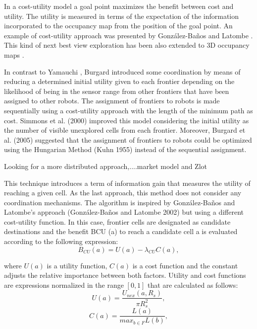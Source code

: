 In a cost-utility model a goal point maximizes the benefit between cost and utility. The utility is measured in terms of the expectation of the information incorporated to the occupancy map from the position of the goal point. An example of cost-utility approach was presented by González-Baños and Latombe \cite{GonzlezBaos2002}. This kind of next best view exploration has been also extended to 3D occupancy maps \cite{Surmann2003}.

In contrast to Yamauchi \cite{Yamauchi1998}, Burgard \cite{Burgard2000} introduced some coordination by means of reducing a determined initial utility given to each frontier depending on the likelihood of being in the sensor range from other frontiers that have been assigned to other robots. The assignment of
frontiers to robots is made sequentially using a cost-utility
approach with the length of the minimum path as cost.\cite{Simmons2000} Simmons et al. (2000) improved this model considering the initial utility as the number of visible unexplored cells from
each frontier. Moreover, Burgard et al. (2005) \cite{Burgard2005} suggested that
the assignment of frontiers to robots could be optimized using the Hungarian Method (Kuhn 1955) instead of the sequential assignment.

Looking for a more distributed approach,....market model and Zlot

This technique introduces a term of information gain that
measures the utility of reaching a given cell. As the last
approach, this method does not consider any coordination
mechanisms. The algorithm is inspired by González-Baños
and Latombe’s approach (González-Baños and Latombe
2002) but using a different cost-utility function. In this case,
frontier cells are designated as candidate destinations and
the benefit BCU (a) to reach a candidate cell a is evaluated
according to the following expression:
\begin{equation}
 B_{CU}(a) = U(a) - \lambda_{CU}C(a),
 \end{equation}

where $U(a)$ is a utility function, $C(a)$ is a cost function and
the constant adjusts the relative importance between both factors. Utility and cost functions are expressions normalized in the range $\left[0, 1\right]$ that are calculated as follows:
\begin{equation}
	U(a) = \frac{U_{nex}(a, R_{s})}{\pi R_{s}^{2}},
\end{equation}
\begin{equation}
	C(a) = \frac{L(a)}{max_{b \in F}L(b)},
\end{equation}

